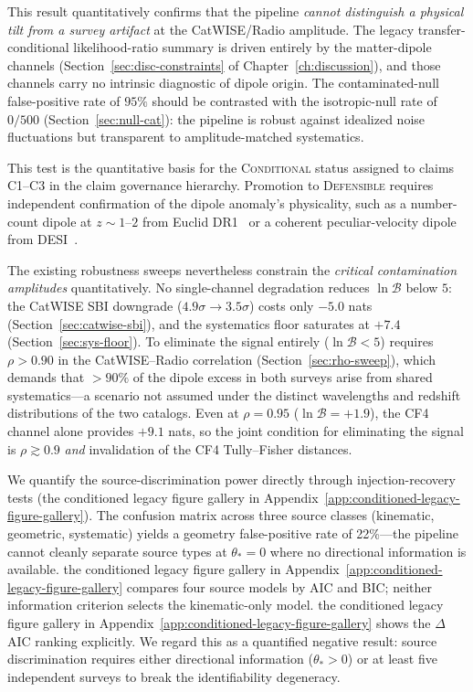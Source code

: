 This result quantitatively confirms that the pipeline
\emph{cannot distinguish a physical tilt from a survey artifact}
at the CatWISE/Radio amplitude.  The legacy transfer-conditional likelihood-ratio summary is
driven entirely by the matter-dipole channels
(Section~\ref{sec:disc-constraints} of
Chapter~\ref{ch:discussion}), and those channels carry no
intrinsic diagnostic of dipole origin.  The contaminated-null
false-positive rate of $95\%$ should be contrasted with the
isotropic-null rate of $0/500$ (Section~\ref{sec:null-cat}):
the pipeline is robust against idealized noise fluctuations but
transparent to amplitude-matched systematics.

This test is the quantitative basis for the \textsc{Conditional}
status assigned to claims C1--C3 in the claim governance
hierarchy.  Promotion to \textsc{Defensible} requires
independent confirmation of the dipole anomaly's physicality,
such as a number-count dipole at $z \sim 1$--$2$ from Euclid
DR1~\cite{Euclid2024} or a coherent peculiar-velocity
dipole from DESI~\cite{DESI2024}.

The existing robustness sweeps nevertheless constrain the
\emph{critical contamination amplitudes} quantitatively.
No single-channel degradation reduces $\ln\mathcal{B}$ below $5$:
the CatWISE SBI downgrade ($4.9\sigma \to 3.5\sigma$) costs
only $-5.0$ nats (Section~\ref{sec:catwise-sbi}), and the
systematics floor saturates at $+7.4$
(Section~\ref{sec:sys-floor}).  To eliminate the signal entirely
($\ln\mathcal{B} < 5$) requires $\rho > 0.90$ in the
CatWISE--Radio correlation (Section~\ref{sec:rho-sweep}), which
demands that $>90\%$ of the dipole excess in both surveys arise
from shared systematics---a scenario not assumed under the
distinct wavelengths and redshift distributions of the two
catalogs.  Even at $\rho = 0.95$ ($\ln\mathcal{B} = +1.9$), the
CF4 channel alone provides $+9.1$ nats, so the joint condition
for eliminating the signal is $\rho \gtrsim 0.9$ \emph{and}
invalidation of the CF4 Tully--Fisher distances.

We quantify the source-discrimination power directly through
injection-recovery tests (the conditioned legacy figure gallery in Appendix~\ref{app:conditioned-legacy-figure-gallery}).
The confusion matrix across three source classes (kinematic,
geometric, systematic) yields a geometry false-positive rate of
22\%---the pipeline cannot cleanly separate source types at
$\theta_* = 0$ where no directional information is available.
the conditioned legacy figure gallery in Appendix~\ref{app:conditioned-legacy-figure-gallery} compares four source
models by AIC and BIC; neither information criterion selects the
kinematic-only model.  the conditioned legacy figure gallery in Appendix~\ref{app:conditioned-legacy-figure-gallery}
shows the $\Delta$AIC ranking explicitly.  We regard this as a
quantified negative result: source discrimination requires either
directional information ($\theta_* > 0$) or at least five
independent surveys to break the identifiability degeneracy.
\label{sec:source_discrimination_limits}


